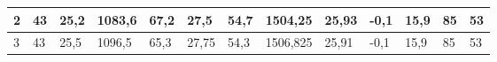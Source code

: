 \begin{table}[H]
{\begin{tabular}{|l|llll|lll|ll|l|ll|}
2             & \multicolumn{1}{l|}{\cellcolor[HTML]{C6E0B4}43}               & \multicolumn{1}{l|}{\cellcolor[HTML]{C6E0B4}25,2}             & \multicolumn{1}{l|}{\cellcolor[HTML]{C6E0B4}1083,6}           & 67,2              & \multicolumn{1}{l|}{\cellcolor[HTML]{C6E0B4}27,5}              & \multicolumn{1}{l|}{\cellcolor[HTML]{C6E0B4}54,7}              & 1504,25           & \multicolumn{1}{l|}{\cellcolor[HTML]{C6E0B4}25,93}            & -0,1             & 15,9                      & \multicolumn{1}{l|}{\cellcolor[HTML]{C6E0B4}85}                  & 53               \\ \hline
\rowcolor[HTML]{E2EFDA} 
3             & \multicolumn{1}{l|}{\cellcolor[HTML]{E2EFDA}43}               & \multicolumn{1}{l|}{\cellcolor[HTML]{E2EFDA}25,5}             & \multicolumn{1}{l|}{\cellcolor[HTML]{E2EFDA}1096,5}           & 65,3              & \multicolumn{1}{l|}{\cellcolor[HTML]{E2EFDA}27,75}             & \multicolumn{1}{l|}{\cellcolor[HTML]{E2EFDA}54,3}              & 1506,825          & \multicolumn{1}{l|}{\cellcolor[HTML]{E2EFDA}25,91}            & -0,1             & 15,9                      & \multicolumn{1}{l|}{\cellcolor[HTML]{E2EFDA}85}                  & 53               \\ \hline
\end{tabular}%
}
\end{table}

